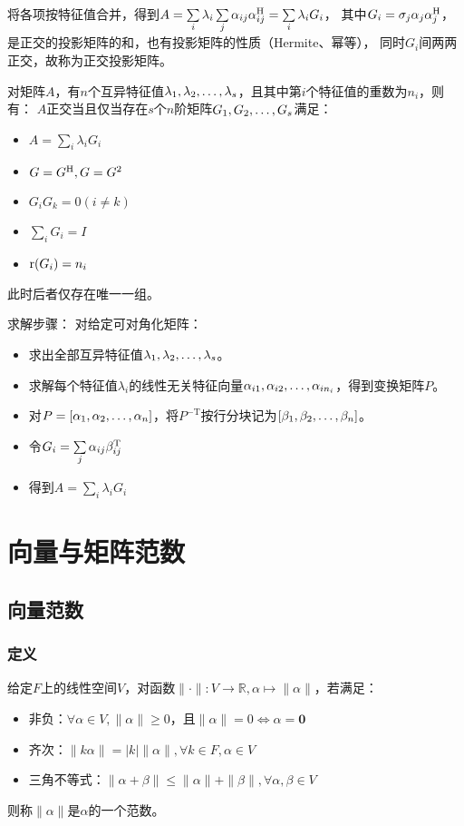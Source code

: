 将各项按特征值合并，得到$A=\sum\limits_i\lambda_i \sum\limits_j \alpha_{ij}\alpha_{ij}^\mathrm{H}=\sum\limits_i\lambda_i G_i$，
其中$G_i=\sigma_j \alpha_j\alpha_j^\mathrm{H}$，是正交的投影矩阵的和，也有投影矩阵的性质（Hermite、幂等），
同时$G_i$间两两正交，故称为正交投影矩阵。

\begin{theorem}
    对矩阵$A$，有$n$个互异特征值$\VectorComma{\lambda}{s}$，且其中第$i$个特征值的重数为$n_i$，则有：
    $A$正交当且仅当存在$s$个$n$阶矩阵$\VectorComma{G}{s}$满足：
    \begin{itemize}
        \item $A=\sum\limits_i\lambda_i G_i$
        \item $G=G^\mathrm{H},G=G^2$
        \item $G_i G_k = 0(i\neq k)$
        \item $\sum\limits_i G_i = I$
        \item $\operatorname{r}(G_i)=n_i$
    \end{itemize}
    此时后者仅存在唯一一组。
\end{theorem}

求解步骤：
对给定可对角化矩阵：
\begin{itemize}
    \item 求出全部互异特征值$\VectorComma{\lambda}{s}$。
    \item 求解每个特征值$\lambda_i$的线性无关特征向量$\VectorRComma{\alpha}{n_i}{i}$，得到变换矩阵$P$。
    \item 对$P=[\VectorComma{\alpha}{n}]$，将$P^{-\mathrm{T}}$按行分块记为$[\VectorComma{\beta}{n}]$。
    \item 令$G_i=\sum\limits_j \alpha_{ij}\beta_{ij}^\mathrm{T}$
    \item 得到$A=\sum\limits_i \lambda_i G_i$
\end{itemize}

\section{向量与矩阵范数}
\subsection{向量范数}
\subsubsection{定义}

\begin{definition}[范数]
    给定$F$上的线性空间$V$，对函数$\|\cdot\|:V\to \mathbb{R},\alpha\mapsto \|\alpha\|$，若满足：
    \begin{itemize}
        \item 非负：$\forall \alpha\in V, \|\alpha\|\geq 0$，且$\|\alpha\|=0\Leftrightarrow \alpha=\bm{0}$
        \item 齐次：$\|k\alpha\|=|k| \|\alpha\|,\forall k\in F, \alpha\in V$
        \item 三角不等式：$\|\alpha+\beta\|\leq \|\alpha\|+\|\beta\|, \forall \alpha,\beta \in V$
    \end{itemize}
    则称$\|\alpha\|$是$\alpha$的一个范数。
\end{definition}


